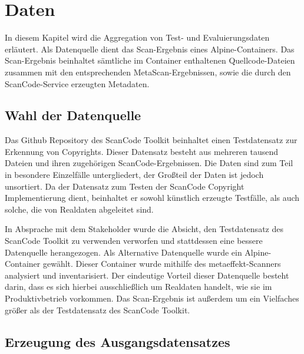 \chapter{Daten}\label{ch:daten}

In diesem Kapitel wird die Aggregation von Test- und Evaluierungsdaten erläutert.
Als Datenquelle dient das Scan-Ergebnis eines Alpine-Containers.
Das Scan-Ergebnis beinhaltet sämtliche im Container enthaltenen Quellcode-Dateien zusammen mit den entsprechenden MetaScan-Ergebnissen, sowie die durch den ScanCode-Service erzeugten Metadaten.

\section{Wahl der Datenquelle}\label{sec:wahl-der-datenquelle}

Das Github Repository des ScanCode Toolkit beinhaltet einen Testdatensatz zur Erkennung von Copyrights.
Dieser Datensatz besteht aus mehreren tausend Dateien und ihren zugehörigen ScanCode-Ergebnissen.
Die Daten sind zum Teil in besondere Einzelfälle untergliedert, der Großteil der Daten ist jedoch unsortiert.
Da der Datensatz zum Testen der ScanCode Copyright Implementierung dient, beinhaltet er sowohl künstlich erzeugte Testfälle, als auch solche, die von Realdaten abgeleitet sind.

In Absprache mit dem Stakeholder wurde die Absicht, den Testdatensatz des ScanCode Toolkit zu verwenden verworfen und stattdessen eine bessere Datenquelle herangezogen.
Als Alternative Datenquelle wurde ein Alpine-Container gewählt.
Dieser Container wurde mithilfe des metaeffekt-Scanners analysiert und inventarisiert.
Der eindeutige Vorteil dieser Datenquelle besteht darin, dass es sich hierbei ausschließlich um Realdaten handelt, wie sie im Produktivbetrieb vorkommen.
Das Scan-Ergebnis ist außerdem um ein Vielfaches größer als der Testdatensatz des ScanCode Toolkit.

\section{Erzeugung des Ausgangsdatensatzes}\label{sec:erzeugung-datensatz}

